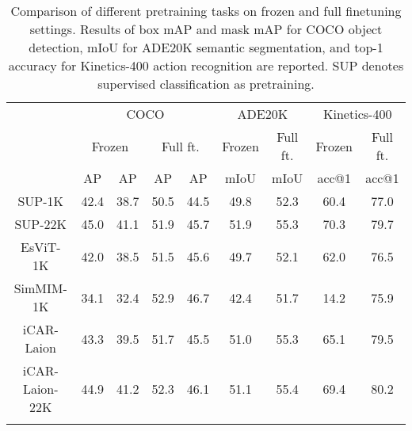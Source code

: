 \documentclass{article}
\begin{document}
\begin{table}[htb]
        \centering
\addtolength{\tabcolsep}{-1.0pt}
        \begin{tabular}{c|cccc|cc|cc}
            \Xhline{1.0pt}
            \multirow{3}{*}{Approach} & \multicolumn{4}{c|}{COCO} & \multicolumn{2}{c|}{ADE20K} & \multicolumn{2}{c}{Kinetics-400}\\
            & \multicolumn{2}{c}{Frozen}& \multicolumn{2}{c|}{Full ft.} & Frozen & Full ft. & Frozen & Full ft. \\
            & AP & AP & AP & AP & mIoU & mIoU & acc@1 & acc@1 \\
            \hline
            SUP-1K & 42.4 & 38.7 & 50.5 & 44.5 & 49.8 & 52.3 & 60.4 & 77.0 \\
            SUP-22K & 45.0 & 41.1 & 51.9 & 45.7 & 51.9 & 55.3 & 70.3 & 79.7 \\
            EsViT-1K & 42.0 & 38.5 & 51.5 & 45.6 & 49.7 & 52.1 & 62.0 & 76.5 \\
            SimMIM-1K & 34.1 & 32.4 & 52.9 & 46.7 & 42.4 & 51.7 & 14.2 & 75.9 \\
            iCAR-Laion & 43.3 & 39.5 & 51.7 & 45.5 & 51.0 & 55.3 & 65.1 & 79.5 \\
            iCAR-Laion-22K & 44.9 & 41.2 & 52.3 & 46.1 & 51.1 & 55.4 & 69.4 & 80.2 \\
          \Xhline{1.0pt}  
       \end{tabular}
     \caption{Comparison of different pretraining tasks on frozen and full finetuning settings. Results of box mAP and mask mAP for COCO object detection, mIoU for ADE20K semantic segmentation, and top-1 accuracy for Kinetics-400 action recognition are reported. SUP denotes supervised classification as pretraining.}
     \label{tab:pretrain_task}
\end{table}
\end{document}
